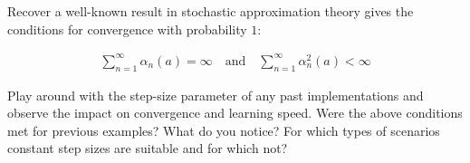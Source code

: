 
\begin{exercise}

Recover a well-known result in stochastic approximation theory gives the conditions for convergence with probability $1$:

\begin{align*}
    \sum_{n=1}^\infty \alpha_n(a) = \infty
    \quad
    \text{and}
    \quad
    \sum_{n=1}^\infty \alpha_n^2(a) < \infty
\end{align*}

Play around with the step-size parameter of any past implementations and observe the impact on convergence and learning speed.
Were the above conditions met for previous examples? What do you notice?
For which types of scenarios constant step sizes are suitable and for which not?

\end{exercise}


\begin{solution}

\phantom{}

\end{solution}

